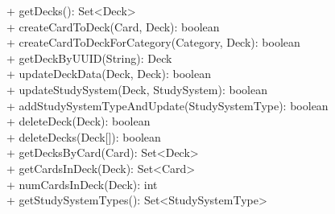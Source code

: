 { 
    + getDecks(): Set<Deck> \\
    + createCardToDeck(Card, Deck): boolean \\
    + createCardToDeckForCategory(Category, Deck): boolean \\
    + getDeckByUUID(String): Deck \\
    + updateDeckData(Deck, Deck): boolean \\
    + updateStudySystem(Deck, StudySystem): boolean \\
    + addStudySystemTypeAndUpdate(StudySystemType): boolean \\
    + deleteDeck(Deck): boolean \\
    + deleteDecks(Deck[]): boolean \\
    + getDecksByCard(Card): Set<Deck> \\
    + getCardsInDeck(Deck): Set<Card> \\
    + numCardsInDeck(Deck): int \\
    + getStudySystemTypes(): Set<StudySystemType> \\
}{} 